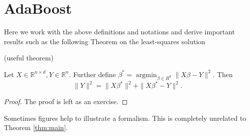 \section{AdaBoost}
\label{adaboost}

Here we work with the above definitions and notations and derive important results such as the following
Theorem on the least-squares solution

\begin{theorem}{(useful theorem)}
\label{thm:main}
\begin{linenomath*}
	Let $X\in\mathbb{R}^{n\times d}, Y\in\mathbb{R}^n$. Further define $\beta^* = \operatorname{argmin}_{\beta\in R^d}\|X\beta-Y\|^2$.
	Then $$\|Y\|^2=\|X\beta^*\|^2 + \|X\beta^* - Y\|^2.$$
\end{linenomath*}

\end{theorem}

\begin{proof}
	The proof is left as an exercise.
\end{proof}

Sometimes figures help to illustrate a formalism. This is completely unrelated to Theorem \ref{thm:main}.
